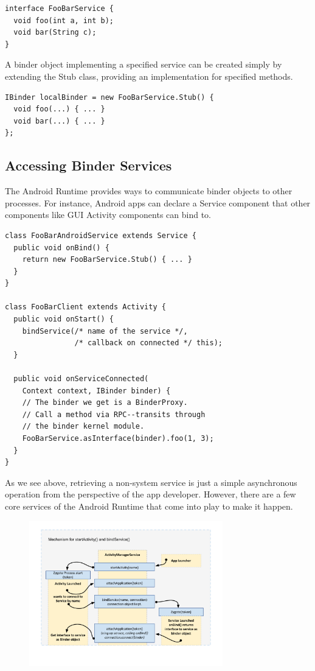 \documentclass[prodmode]{acmlarge}
\begin{document}
\begin{Verbatim}[samepage=true]
interface FooBarService {
  void foo(int a, int b);
  void bar(String c);
}
\end{Verbatim}

A binder object implementing a specified service can be created simply by extending the Stub class, providing an implementation for specified methods.
\begin{Verbatim}[samepage=true]
IBinder localBinder = new FooBarService.Stub() {
  void foo(...) { ... }
  void bar(...) { ... }
};
\end{Verbatim}

\subsection{Accessing Binder Services}
The Android Runtime provides ways to communicate binder objects to other processes. For instance, Android apps can declare a Service component that other components like GUI Activity components can bind to.

\begin{Verbatim}[samepage=true]
class FooBarAndroidService extends Service {
  public void onBind() {
    return new FooBarService.Stub() { ... }
  }
}

class FooBarClient extends Activity {
  public void onStart() {
    bindService(/* name of the service */,
                /* callback on connected */ this);
  }

  public void onServiceConnected(
    Context context, IBinder binder) {
    // The binder we get is a BinderProxy.
    // Call a method via RPC--transits through
    // the binder kernel module.
    FooBarService.asInterface(binder).foo(1, 3);
  }
}
\end{Verbatim}

As we see above, retrieving a non-system service is just a simple asynchronous operation from the perspective of the app developer. However, there are a few core services of the Android Runtime that come into play to make it happen.

\begin{figure}
\centering
\includegraphics[width=0.75\textwidth]{drawings/bindService.pdf}
\end{figure}
\end{document}
